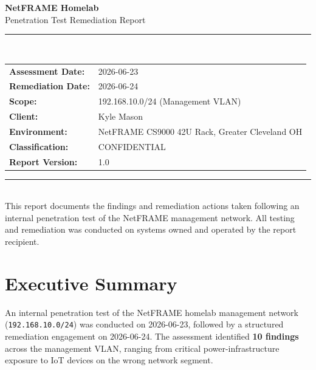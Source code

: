 \documentclass[11pt,a4paper]{article}
\begin{document}
\begin{titlepage}
  \centering
  \vspace*{3cm}

  {\Huge\bfseries\color{netframe} NetFRAME Homelab}\\[0.4em]
  {\LARGE\color{netframe!70} Penetration Test Remediation Report}\\[2em]

  \rule{\linewidth}{1.5pt}\\[1em]

  \begin{tabular}{ll}
    \textbf{Assessment Date:} & 2026-06-23 \\[0.3em]
    \textbf{Remediation Date:} & 2026-06-24 \\[0.3em]
    \textbf{Scope:} & 192.168.10.0/24 (Management VLAN) \\[0.3em]
    \textbf{Client:} & Kyle Mason \\[0.3em]
    \textbf{Environment:} & NetFRAME CS9000 42U Rack, Greater Cleveland OH \\[0.3em]
    \textbf{Classification:} & CONFIDENTIAL \\[0.3em]
    \textbf{Report Version:} & 1.0 \\
  \end{tabular}

  \vfill

  \rule{\linewidth}{0.4pt}\\[0.5em]
  {\small This report documents the findings and remediation actions taken following an internal
  penetration test of the NetFRAME management network. All testing and remediation was
  conducted on systems owned and operated by the report recipient.}

\end{titlepage}

\tableofcontents
\newpage

\section{Executive Summary}

An internal penetration test of the NetFRAME homelab management network
(\texttt{192.168.10.0/24}) was conducted on 2026-06-23, followed by a structured remediation
engagement on 2026-06-24. The assessment identified \textbf{10 findings} across the
management VLAN, ranging from critical power-infrastructure exposure to IoT devices on the
wrong network segment.
\end{document}
